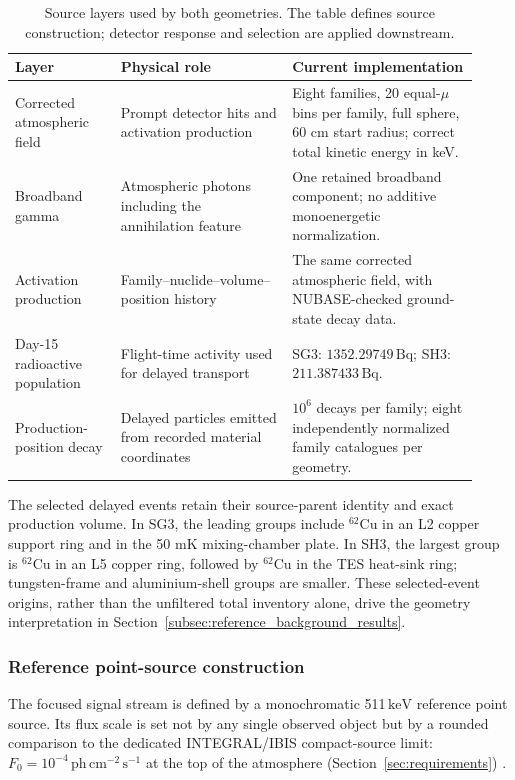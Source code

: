 \documentclass[11pt]{article}
\newcommand{\keV}{\ensuremath{\,\mathrm{keV}}}
\newcommand{\phcms}{\ensuremath{\,\mathrm{ph\,cm^{-2}\,s^{-1}}}}
\newcommand{\fzero}{F_{0}}
\begin{document}
\begin{table}[t]
\centering
\caption{Source layers used by both geometries. The table defines source
construction; detector response and selection are applied downstream.}
\label{tab:background_source_model}
\footnotesize
\begin{tabular}{p{0.21\linewidth}p{0.34\linewidth}p{0.37\linewidth}}
\toprule
Layer & Physical role & Current implementation \\
\midrule
Corrected atmospheric field & Prompt detector hits and activation production &
Eight families, 20 equal-$\mu$ bins per family, full sphere, 60 cm start radius;
correct total kinetic energy in keV. \\
Broadband gamma & Atmospheric photons including the annihilation feature &
One retained broadband component; no additive monoenergetic normalization. \\
Activation production & Family--nuclide--volume--position history &
The same corrected atmospheric field, with NUBASE-checked ground-state decay data. \\
Day-15 radioactive population & Flight-time activity used for delayed transport &
SG3: $1352.29749\,\mathrm{Bq}$; SH3: $211.387433\,\mathrm{Bq}$. \\
Production-position decay & Delayed particles emitted from recorded material coordinates &
$10^6$ decays per family; eight independently normalized family catalogues per geometry. \\
\bottomrule
\end{tabular}
\end{table}

The selected delayed events retain their source-parent identity and exact
production volume. In SG3, the leading groups include $^{62}$Cu in an L2 copper
support ring and in the 50 mK mixing-chamber plate. In SH3, the largest group is
$^{62}$Cu in an L5 copper ring, followed by $^{62}$Cu in the TES heat-sink ring;
tungsten-frame and aluminium-shell groups are smaller. These selected-event
origins, rather than the unfiltered total inventory alone, drive the geometry
interpretation in Section~\ref{subsec:reference_background_results}.

\subsubsection{Reference point-source construction}
\label{subsec:pointsource}

The focused signal stream is defined by a monochromatic 511\keV{} reference
point source. Its flux scale is set not by any single observed object but by a
rounded comparison to the dedicated INTEGRAL/IBIS compact-source limit:
$\fzero=10^{-4}\phcms$ at the top of the atmosphere
(Section~\ref{sec:requirements}) \cite{DeCesare2011}.
\end{document}
